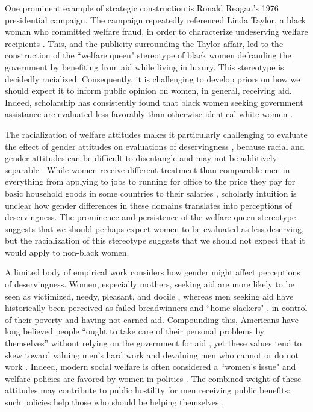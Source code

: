\documentclass[12pt]{article}%
\begin{document}
\begin{doublespace}
One prominent example of strategic construction is Ronald Reagan's 1976 presidential campaign. The campaign repeatedly referenced Linda Taylor, a black woman who committed welfare fraud, in order to characterize undeserving welfare recipients \citep{gilman2013return}. This, and the publicity surrounding the Taylor affair, led to the construction of the ``welfare queen" stereotype of black women defrauding the government by benefiting from aid while living in luxury. This stereotype is decidedly racialized. Consequently, it is challenging to develop priors on how we should expect it to inform public opinion on women, in general, receiving aid. Indeed, scholarship has consistently found that black women seeking government assistance are evaluated less favorably than otherwise identical white women \citep{gilliam_welfare_1999, desante_working_2013, hayes_2020}.

The racialization of welfare attitudes makes it particularly challenging to evaluate the effect of gender attitudes on evaluations of deservingness \citep{winter_beyond_2006}, because racial and gender attitudes can be difficult to disentangle and may not be additively separable \cite{hayes2021race}. While women receive different treatment than comparable men in everything from applying to jobs \citep{neumark_sex_1996, goldin_orchestrating_2000, quadlin_market} to running for office \citep{hassell_partys_2019, clayton_how_2020} to the price they pay for basic household goods in some countries \citep{betz_womens_2021} to their salaries \citep{castillo_gender_2013, mandel_up_2013}, scholarly intuition is unclear how gender differences in these domains translates into perceptions of deservingness. The prominence and persistence of the welfare queen stereotype suggests that we should perhaps expect women to be evaluated as less deserving, but the racialization of this stereotype suggests that we should not expect that it would apply to non-black women. 

A limited body of empirical work considers how gender might affect perceptions of deservingness. Women, especially mothers, seeking aid are more likely to be seen as victimized, needy, pleasant, and docile \citep{glick_hostile_1997, glick_ambivalent_2001, schneider_social_1993, monnat2010color, monnat2010toward}, whereas men seeking aid have historically been perceived as failed breadwinners and ``home slackers" \citep{willrich2000home}, in control of their poverty and having not earned aid. Compounding this, Americans have long believed people ``ought to take care of their personal problems by themselves” without relying on the government for aid \citep{sniderman_coping_1977}, yet these values tend to skew toward valuing men's hard work and devaluing men who cannot or do not work \citep{willrich2000home}. Indeed, modern social welfare is often considered a ``women's issue" and welfare policies are favored by women in politics \citep{krook2012all, greene2016diverse}. The combined weight of these attitudes may contribute to public hostility for men receiving public benefits: such policies help those who should be helping themselves \citep{bobocel_justice-based_1998, katz_racial_1988, sniderman_symbolic_1986, sniderman_beyond_1996, mclosky_ethos}.


\end{doublespace}
\end{document}
